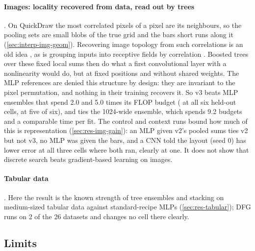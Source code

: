 \paragraph{Images: locality recovered from data, read out by trees} . On QuickDraw the most correlated pixels of a pixel are its neighbours, so the pooling sets are small blobs of the true grid and the bars short runs along it (\cref{sec:interp-img-geom}). Recovering image topology from such correlations is an old idea \cite{leroux2007topology}, as is grouping inputs into receptive fields by correlation \cite{coates2011receptive}. Boosted trees \cite{ke2017lightgbm} over these fixed local sums then do what a first convolutional layer with a nonlinearity would do, but at fixed positions and without shared weights. The MLP references are denied this structure by design: they are invariant to the pixel permutation, and nothing in their training recovers it. So v3 beats MLP ensembles that spend 2.0 and 5.0 times its FLOP budget ( at all six held-out cells,  at five of six), and ties the 1024-wide ensemble, which spends 9.2 budgets and a comparable time per fit. The control and context runs bound how much of this is representation (\cref{sec:res-img-gain}): an MLP given v2's pooled sums ties v2 but not v3, no MLP was given the bars, and a CNN told the layout (seed 0) has lower error at all three cells where both ran, clearly at one. It does not show that discrete search beats gradient-based learning on images.

\paragraph{Tabular data} . Here the result is the known strength of tree ensembles and stacking on medium-sized tabular data against standard-recipe MLPs (\cref{sec:res-tabular}); DFG runs on 2 of the 26 datasets and changes no cell there clearly.

\subsection{Limits}\label{sec:disc-limits}

